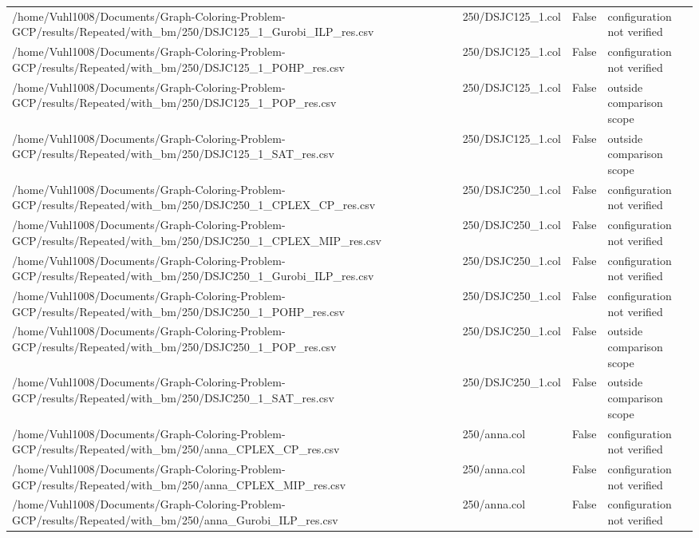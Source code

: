 \begin{table}[htbp]
\begin{tabular}{llll}
/home/Vuhl1008/Documents/Graph-Coloring-Problem-GCP/results/Repeated/with\_bm/250/DSJC125\_1\_Gurobi\_ILP\_res.csv & 250/DSJC125\_1.col & False & configuration not verified \\
/home/Vuhl1008/Documents/Graph-Coloring-Problem-GCP/results/Repeated/with\_bm/250/DSJC125\_1\_POHP\_res.csv & 250/DSJC125\_1.col & False & configuration not verified \\
/home/Vuhl1008/Documents/Graph-Coloring-Problem-GCP/results/Repeated/with\_bm/250/DSJC125\_1\_POP\_res.csv & 250/DSJC125\_1.col & False & outside comparison scope \\
/home/Vuhl1008/Documents/Graph-Coloring-Problem-GCP/results/Repeated/with\_bm/250/DSJC125\_1\_SAT\_res.csv & 250/DSJC125\_1.col & False & outside comparison scope \\
/home/Vuhl1008/Documents/Graph-Coloring-Problem-GCP/results/Repeated/with\_bm/250/DSJC250\_1\_CPLEX\_CP\_res.csv & 250/DSJC250\_1.col & False & configuration not verified \\
/home/Vuhl1008/Documents/Graph-Coloring-Problem-GCP/results/Repeated/with\_bm/250/DSJC250\_1\_CPLEX\_MIP\_res.csv & 250/DSJC250\_1.col & False & configuration not verified \\
/home/Vuhl1008/Documents/Graph-Coloring-Problem-GCP/results/Repeated/with\_bm/250/DSJC250\_1\_Gurobi\_ILP\_res.csv & 250/DSJC250\_1.col & False & configuration not verified \\
/home/Vuhl1008/Documents/Graph-Coloring-Problem-GCP/results/Repeated/with\_bm/250/DSJC250\_1\_POHP\_res.csv & 250/DSJC250\_1.col & False & configuration not verified \\
/home/Vuhl1008/Documents/Graph-Coloring-Problem-GCP/results/Repeated/with\_bm/250/DSJC250\_1\_POP\_res.csv & 250/DSJC250\_1.col & False & outside comparison scope \\
/home/Vuhl1008/Documents/Graph-Coloring-Problem-GCP/results/Repeated/with\_bm/250/DSJC250\_1\_SAT\_res.csv & 250/DSJC250\_1.col & False & outside comparison scope \\
/home/Vuhl1008/Documents/Graph-Coloring-Problem-GCP/results/Repeated/with\_bm/250/anna\_CPLEX\_CP\_res.csv & 250/anna.col & False & configuration not verified \\
/home/Vuhl1008/Documents/Graph-Coloring-Problem-GCP/results/Repeated/with\_bm/250/anna\_CPLEX\_MIP\_res.csv & 250/anna.col & False & configuration not verified \\
/home/Vuhl1008/Documents/Graph-Coloring-Problem-GCP/results/Repeated/with\_bm/250/anna\_Gurobi\_ILP\_res.csv & 250/anna.col & False & configuration not verified \\

\end{tabular}
\end{table}
